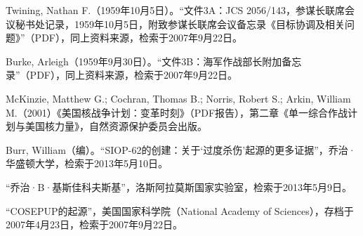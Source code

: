 \begin{enumerate}
Twining, Nathan F.（1959年10月5日）。“文件3A：JCS 2056/143，参谋长联席会议秘书处记录，1959年10月5日，附致参谋长联席会议备忘录《目标协调及相关问题》”（PDF），同上资料来源，检索于2007年9月22日。

Burke, Arleigh（1959年9月30日）。“文件3B：海军作战部长附加备忘录”（PDF），同上资料来源，检索于2007年9月22日。

McKinzie, Matthew G.; Cochran, Thomas B.; Norris, Robert S.; Arkin, William M.（2001）《美国核战争计划：变革时刻》（PDF报告），第二章《单一综合作战计划与美国核力量》，自然资源保护委员会出版。

Burr, William（编）。“SIOP-62的创建：关于‘过度杀伤’起源的更多证据”，乔治·华盛顿大学，检索于2013年5月10日。

“乔治·B·基斯佳科夫斯基”，洛斯阿拉莫斯国家实验室，检索于2013年5月9日。

“COSEPUP的起源”，美国国家科学院（National Academy of Sciences），存档于2007年4月23日，检索于2007年9月22日。

\end{enumerate}